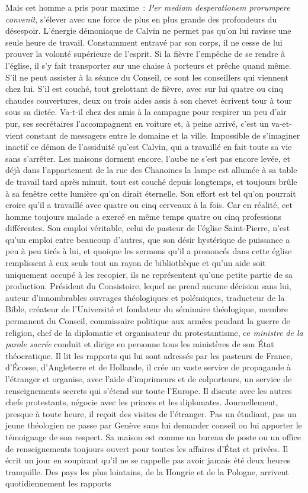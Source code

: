 \documentclass[french,twoside]{book} %
\newcommand\foreign[1]{\emph{#1}}
\begin{document}
Mais cet homme a pris pour maxime : \foreign{Per mediam desperationem prorumpere convenit}, s’élever avec une force de plus en plus grande des profondeurs du désespoir. L’énergie démoniaque de Calvin ne permet pas qu’on lui ravisse une seule heure de travail. Constamment entravé par son corps, il ne cesse de lui prouver la volonté supérieure de l’esprit. Si la fièvre l’empêche de se rendre à l’église, il s’y fait transporter sur une chaise à porteurs et prêche quand même. S’il ne peut assister à la séance du Conseil, ce sont les conseillers qui viennent chez lui. S’il est couché, tout grelottant de fièvre, avec sur lui quatre ou cinq chaudes couvertures, deux ou trois aides assis à son chevet écrivent tour à tour sous sa dictée. Va-t-il chez des amis à la campagne pour respirer un peu d’air pur, ses secrétaires l’accompagnent en voiture et, à peine arrivé, c’est un va-et-vient constant de messagers entre le domaine et la ville. Impossible de s’imaginer inactif ce démon de l’assiduité qu’est Calvin, qui a travaillé en fait toute sa vie sans s’arrêter. Les maisons dorment encore, l’aube ne s’est pas encore levée, et déjà dans l’appartement de la rue des Chanoines la lampe est allumée à sa table de travail tard après minuit, tout est couché depuis longtemps, et toujours brûle à sa fenêtre cette lumière qu’on dirait éternelle. Son effort est tel qu’on pourrait croire qu’il a travaillé avec quatre ou cinq cerveaux à la fois. Car en réalité, cet homme toujours malade a exercé en même temps quatre ou cinq professions différentes. Son emploi véritable, celui de pasteur de l’église Saint-Pierre, n’est qu’un emploi entre beaucoup d’autres, que son désir hystérique de puissance a peu à peu tirés à lui, et quoique les sermons qu’il a prononcés dans cette église remplissent à eux seuls tout un rayon de bibliothèque et qu’un aide soit uniquement occupé à les recopier, ils ne représentent qu’une petite partie de sa production. Président du Consistoire, lequel ne prend aucune décision sans lui, auteur d’innombrables ouvrages théologiques et polémiques, traducteur de la Bible, créateur de l’Université et fondateur du séminaire théologique, membre permanent du Conseil, commissaire politique aux armées pendant la guerre de religion, chef de la diplomatie et organisateur du protestantisme, ce \emph{ministre de la parole sacrée} conduit et dirige en personne tous les ministères de son État théocratique. Il lit les rapports qui lui sont adressés par les pasteurs de France, d’Écosse, d’Angleterre et de Hollande, il crée un vaste service de propagande à l’étranger et organise, avec l’aide d’imprimeurs et de colporteurs, un service de renseignements secrets qui s’étend sur toute l’Europe. Il discute avec les autres chefs protestants, négocie avec les princes et les diplomates. Journellement, presque à toute heure, il reçoit des visites de l’étranger. Pas un étudiant, pas un jeune théologien ne passe par Genève sans lui demander conseil ou lui apporter le témoignage de son respect. Sa maison est comme un bureau de poste ou un office de renseignements toujours ouvert pour toutes les affaires d’État et privées. Il écrit un jour en soupirant qu’il ne se rappelle pas avoir jamais été deux heures tranquille. Des pays les plus lointains, de la Hongrie et de la Pologne, arrivent quotidiennement les rapports 
\end{document}

